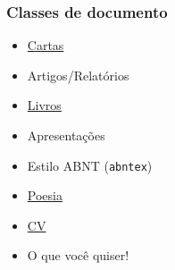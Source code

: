 \documentclass{beamer}
\begin{document}
\begin{frame}
   \frametitle{Classes de documento}
   \begin{itemize}
      \item \href{exemplo_carta.pdf}{Cartas}
      \item Artigos/Relatórios
      \item \href{beameruserguide.pdf}{Livros}
      \item Apresentações
      \item Estilo ABNT ({\tt{abntex}})
      \item \href{ornament.pdf}{Poesia}
      \item \href{cv.pdf}{CV}
      \item \alert{O que você quiser!}
   \end{itemize}
\end{frame}
\end{document}
